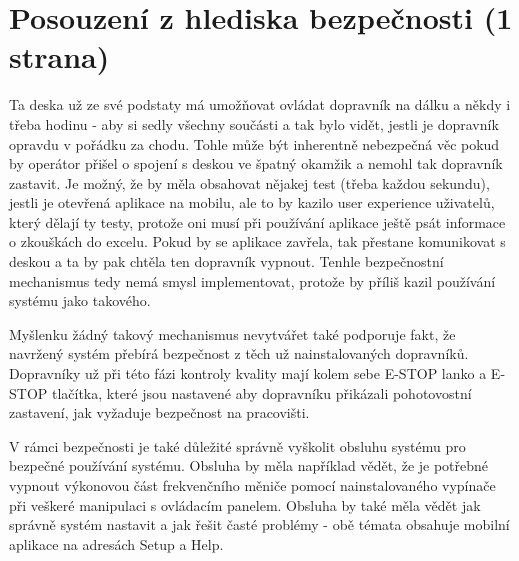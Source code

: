 \section{Posouzení z hlediska bezpečnosti (1 strana)}\label{sec:PosouzeniZHlediskaBezpecnosti}

Ta deska už ze své podstaty má umožňovat ovládat dopravník na dálku a někdy i třeba hodinu - aby si sedly všechny součásti a tak bylo vidět, jestli je dopravník opravdu v pořádku za chodu. Tohle může být inherentně nebezpečná věc pokud by operátor přišel o spojení s deskou ve špatný okamžik a nemohl tak dopravník zastavit. Je možný, že by měla obsahovat nějakej test (třeba každou sekundu), jestli je otevřená aplikace na mobilu, ale to by kazilo user experience uživatelů, který dělají ty testy, protože oni musí při používání aplikace ještě psát informace o zkouškách do excelu. Pokud by se aplikace zavřela, tak přestane komunikovat s deskou a ta by pak chtěla ten dopravník vypnout. Tenhle bezpečnostní mechanismus tedy nemá smysl implementovat, protože by příliš kazil používání systému jako takového.

Myšlenku žádný takový mechanismus nevytvářet také podporuje fakt, že navržený systém přebírá bezpečnost z těch už nainstalovaných dopravníků. Dopravníky už při této fázi kontroly kvality mají kolem sebe E-STOP lanko a E-STOP tlačítka, které jsou nastavené aby dopravníku přikázali pohotovostní zastavení, jak vyžaduje bezpečnost na pracovišti.

V rámci bezpečnosti je také důležité správně vyškolit obsluhu systému pro bezpečné používání systému. Obsluha by měla například vědět, že je potřebné vypnout výkonovou část frekvenčního měniče pomocí nainstalovaného vypínače při veškeré manipulaci s ovládacím panelem. Obsluha by také měla vědět jak správně systém nastavit a jak řešit časté problémy - obě témata obsahuje mobilní aplikace na adresách Setup a Help.

